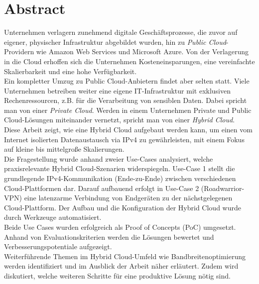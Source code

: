 \chapter{Abstract}

Unternehmen verlagern zunehmend digitale Geschäftsprozesse, die zuvor auf eigener, physischer Infrastruktur abgebildet wurden, hin zu \textit{Public Cloud}-Providern wie Amazon Web Services und Microsoft Azure. Von der Verlagerung in die Cloud erhoffen sich die Unternehmen Kosteneinsparungen, eine vereinfachte Skalierbarkeit und eine hohe Verfügbarkeit.\\
Ein kompletter Umzug zu Public Cloud-Anbietern findet aber selten statt. Viele Unternehmen betreiben weiter eine eigene IT-Infrastruktur mit exklusiven Rechenressourcen, z.B. für die Verarbeitung von sensiblen Daten. Dabei spricht man von einer \textit{Private Cloud}. Werden in einem Unternehmen Private und Public Cloud-Lösungen miteinander vernetzt, spricht man von einer \textit{Hybrid Cloud}. \\
Diese Arbeit zeigt, wie eine Hybrid Cloud aufgebaut werden kann, um einen vom Internet isolierten Datenaustausch via IPv4 zu gewährleisten, mit einem Fokus auf kleine bis mittelgroße Skalierungen.\\
Die Fragestellung wurde anhand zweier Use-Cases analysiert, welche praxisrelevante Hybrid Cloud-Szenarien widerspiegeln. Use-Case 1 stellt die grundlegende IPv4-Kommunikation (\glqq Ende-zu-Ende\grqq{}) zwischen verschiedenen Cloud-Plattformen dar. Darauf aufbauend erfolgt in Use-Case 2 (\glqq Roadwarrior-VPN\grqq{}) eine latenzarme Verbindung von Endgeräten zu der nächstgelegenen Cloud-Plattform. Der Aufbau und die Konfiguration der Hybrid Cloud wurde durch Werkzeuge automatisiert.\\
Beide Use Cases wurden erfolgreich als Proof of Concepts (PoC) umgesetzt. Anhand von Evaluationskriterien werden die Lösungen bewertet und Verbesserungspotentiale aufgezeigt.\\
Weiterführende Themen im Hybrid Cloud-Umfeld wie Bandbreitenoptimierung werden identifiziert und im Ausblick der Arbeit näher erläutert. Zudem wird diskutiert, welche weiteren Schritte für eine produktive Lösung nötig sind.\\